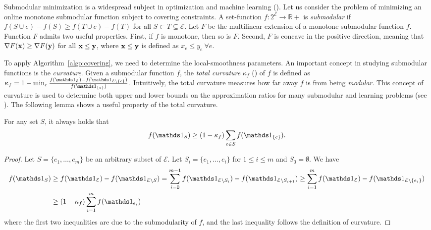 Submodular minimization is a widespread subject in optimization and machine learning (\cite{IwataFleischer01:A-combinatorial-strongly,Bachothers13:Learning-with,Bach16:Submodular-functions:,BalkanskiSinger:2020}). Let us consider the problem of minimizing an online monotone submodular function subject to covering constraints.
A set-function $f: 2^{\mathcal{E}} \rightarrow \mathbb{R}+$ is \emph{submodular} if
$f(S \cup e) - f(S) \geq f(T \cup e) - f(T)$ for all $S \subset T \subseteq \mathcal{E}$.
Let $F$ be the multilinear extension of a monotone submodular function $f$. Function $F$
admits two useful properties. First, if $f$ is monotone, then so is $F$. Second, $F$ is concave in
the positive direction, meaning that $\nabla F(\mathbf{x}) \geq \nabla F(\mathbf{y})$ for all $\mathbf{x} \leq \mathbf{y}$, where $\mathbf{x} \leq \mathbf{y}$ is defined as $x_{e} \leq y_{e} ~\forall e$.

To apply Algorithm~\ref{algo:covering}, we need to determine the local-smoothness parameters.
An important concept in studying submodular functions is the \emph{curvature}. Given a submodular
function $f$, the \emph{total curvature} $\kappa_{f}$ (\cite{ConfortiCornuejols84:Submodular-set-functions}) of $f$ is defined as
$
\kappa_{f} = 1 - \min_{e} \frac{f(\one_{\mathcal{E}}) - f(\one_{\mathcal{E} \setminus \{e\}})}{f(\one_{\{e\}})}.
$
Intuitively, the total curvature measures how far away $f$ is from being \emph{modular}. This concept of
curvature is used to determine both upper and lower bounds on the approximation ratios
for many submodular and learning problems (see \cite{ConfortiCornuejols84:Submodular-set-functions,GoemansHarvey09:Approximating-submodular,BalcanHarvey12:Learning-Submodular,Vondrak10:Submodularity-and-Curvature:,IyerJegelka13:Curvature-and-optimal,SviridenkoVondrak17:Optimal-approximation}).
The following lemma shows a useful property of the total curvature.

\setcounter{theorem}{7}
\begin{lemma}		\label{lem:curvature}
For any set $S$, it always holds that
$$
f(\one_{S}) \geq (1-\kappa_{f}) \sum_{e \in S} f(\one_{\{e\}}).
$$
\end{lemma}
\begin{proof}
Let $S = \{e_{1}, \ldots, e_{m}\}$ be an
arbitrary subset of $\mathcal{E}$. Let $S_{i} = \{e_{1}, \ldots, e_{i}\}$ for $1 \leq i \leq m$ and $S_{0} = \emptyset$.
We have
\begin{align*}
f(\one_{S})
&\geq  f(\one_{\mathcal{E}}) -  f(\one_{\mathcal{E} \setminus S})
= \sum_{i=0}^{m-1}  f(\one_{\mathcal{E} \setminus S_{i}}) - f(\one_{\mathcal{E} \setminus S_{i+1}})
\geq \sum_{i=1}^{m}  f(\one_{\mathcal{E}}) - f(\one_{\mathcal{E} \setminus \{e_{i}\}}) \\
&\geq (1 - \kappa_{f}) \sum_{i=1}^{m} f(\one_{e_{i}})
\end{align*}
where the first two inequalities are due to the submodularity of $f$, and the last inequality follows the definition of curvature.
\end{proof}

